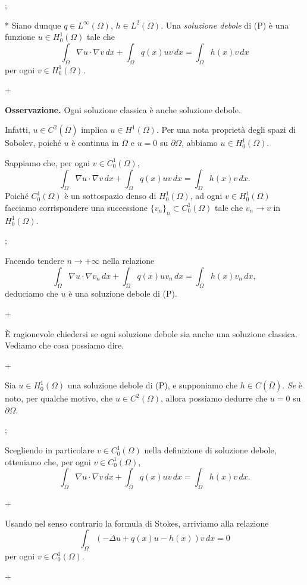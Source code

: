 \pg;

* Siano dunque $q \in L^\infty(\Omega)$, $h \in
L^2(\Omega)$. Una {\em soluzione debole} di (P) \`e una funzione $u
\in H_0^1(\Omega)$ tale che
$$
\int_\Omega \nabla u \cdot \nabla v \, dx + \int_\Omega q(x) u v \, dx
= \int_\Omega h(x) v \, dx
$$
per ogni $v \in H_0^1(\Omega)$.

\pg+

{\bf Osservazione.} Ogni soluzione classica \`e anche soluzione
debole.

Infatti, $u \in C^2(\overline{\Omega})$ implica $u \in
H^1(\Omega)$. Per una nota propriet\`a degli spazi di Sobolev,
poich\'e $u$ \`e continua in $\overline{\Omega}$ e $u=0$ su
$\partial\Omega$, abbiamo $u \in H_0^1(\Omega)$.

Sappiamo che, per ogni $v \in C_0^1(\Omega)$,
$$
\int_\Omega \nabla u \cdot \nabla v \, dx + \int_\Omega q(x) u v \, dx
= \int_\Omega h(x)v \, dx.
$$
Poich\'e $C_0^1(\Omega)$ \`e un sottospazio denso di $H_0^1(\Omega)$,
ad ogni $v \in H_0^1(\Omega)$ facciamo corrispondere una successione
$\{v_n\}_n \subset C_0^1(\Omega)$ tale che $v_n \to v$ in
$H_0^1(\Omega)$.

\pg;

Facendo tendere $n \to +\infty$ nella relazione
$$
\int_\Omega \nabla u \cdot \nabla v_n \, dx + \int_\Omega q(x) u v_n \, dx
= \int_\Omega h(x)v_n \, dx,
$$
deduciamo che $u$ \`e una soluzione debole di (P).

\pg+

\`E ragionevole chiedersi se ogni soluzione debole sia anche una
soluzione classica. Vediamo che cosa possiamo dire.

\pg+

Sia $u \in H_0^1(\Omega)$ una soluzione debole di (P), e supponiamo
che $h \in C(\overline{\Omega})$. {\em Se} \`e noto, per qualche
motivo, che $u \in C^2(\Omega)$, allora possiamo dedurre che $u=0$ su
$\partial\Omega$.

\pg;

Scegliendo in particolare $v \in C_0^1(\Omega)$ nella definizione di
soluzione debole, otteniamo che, per ogni $v \in C_0^1(\Omega)$,
$$
\int_\Omega \nabla u \cdot \nabla v \, dx + \int_\Omega q(x) u v \, dx
= \int_\Omega h(x)v \, dx.
$$

\pg+

Usando nel senso contrario la formula di Stokes, arriviamo alla
relazione
$$
\int_\Omega \left( -\Delta u + q(x) u -h(x) \right) v\, dx=0
$$
per ogni $v \in C_0^1(\Omega)$.

\pg+

